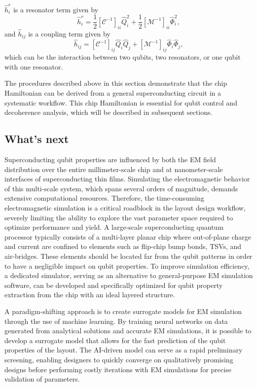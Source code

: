 \documentclass[a4paper,onecolumn,11pt,unpublished]{quantumarticle}
\begin{document}
$\hat{h}_{i}^r $ is a resonator term given by
\begin{equation}
    \hat{h}_{i}^r = \frac{1}{2} \left[ \mathcal{C}^{-1} \right]_{ii} \hat{Q}_i^2
    + \frac{1}{2} \left[ \mathcal{M}^{-1} \right]_{ii} \hat{\Phi}_i^2,
\end{equation}
and $\hat{h}_{ij}$ is a coupling term given by
\begin{equation}
    \hat{h}_{ij} = \left[ \mathcal{C}^{-1} \right]_{ij} \hat{Q}_i \hat{Q}_j 
    + \left[ \mathcal{M}^{-1} \right]_{ij} \hat{\Phi}_i \hat{\Phi}_j,
\end{equation}
which can be the interaction between two qubits, two resonators, or one qubit with one resonator.

The procedures described above in this section demonstrate that the chip Hamiltonian can be derived from a general superconducting circuit in a systematic workflow. This chip Hamiltonian is essential for qubit control and decoherence analysis, which will be described in subsequent sections.

\subsection{What's next}
Superconducting qubit properties are influenced by both the EM field distribution over the entire millimeter-scale chip and at nanometer-scale interfaces of superconducting thin films. Simulating the electromagnetic behavior of this multi-scale system, which spans several orders of magnitude, demands extensive computational resources. Therefore, the time-consuming electromagnetic simulation is a critical roadblock in the layout design workflow, severely limiting the ability to explore the vast parameter space required to optimize performance and yield. A large-scale superconducting quantum processor typically consists of a multi-layer planar chip where out-of-plane charge and current are confined to elements such as flip-chip bump bonds, TSVs, and air-bridges. These elements should be located far from the qubit patterns in order to have a negligible impact on qubit properties. To improve simulation efficiency, a dedicated simulator, serving as an alternative to general-purpose EM simulation software, can be developed and specifically optimized for qubit property extraction from the chip with an ideal layered structure. 

A paradigm-shifting approach is to create surrogate models for EM simulation through the use of machine learning. By training neural networks on data generated from analytical solutions and accurate EM simulations, it is possible to develop a surrogate model that allows for the fast prediction of the qubit properties of the layout. The AI-driven model can serve as a rapid preliminary screening, enabling designers to quickly converge on qualitatively promising designs before performing costly iterations with EM simulations for precise validation of parameters.
\end{document}

